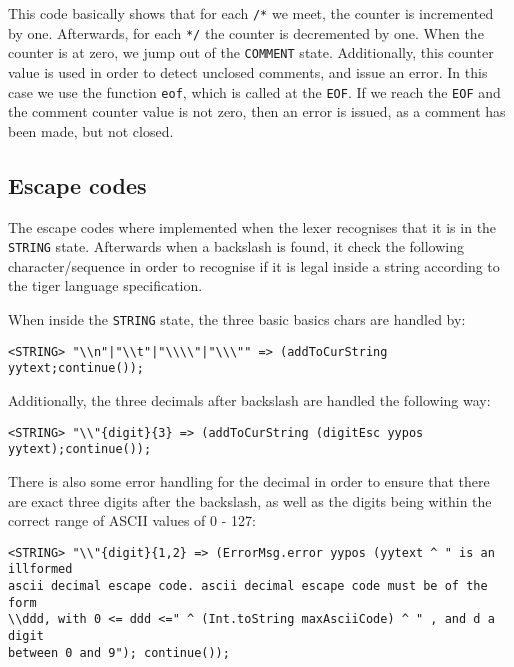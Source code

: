 \documentclass{article}
\begin{document}
This code basically shows that for each \texttt{/*} we meet, the counter is incremented by one. Afterwards, for each \texttt{*/} the counter is decremented by one. When the counter is at zero, we jump out of the \texttt{COMMENT} state. Additionally, this counter value is used in order to detect unclosed comments, and issue an error. In this case we use the function \texttt{eof}, which is called at the \texttt{EOF}. If we reach the \texttt{EOF} and the comment counter value is not zero, then an error is issued, as a comment has been made, but not closed.  

\subsection{Escape codes}
The escape codes where implemented when the lexer recognises that it is in the \texttt{STRING} state. Afterwards when a backslash is found, it check the following character/sequence in order to recognise if it is legal inside a string according to the tiger language specification. 


When inside the \texttt{STRING} state, the three basic basics chars are handled by:

\begin{lstlisting}[frame=single]
<STRING> "\\n"|"\\t"|"\\\\"|"\\\"" => (addToCurString yytext;continue());
\end{lstlisting}

Additionally, the three decimals after backslash are handled the following way:

\begin{lstlisting}[frame=single]
<STRING> "\\"{digit}{3} => (addToCurString (digitEsc yypos yytext);continue());
\end{lstlisting}

There is also some error handling for the decimal in order to ensure that there are exact three digits after the backslash, as well as the digits being within the correct range of ASCII values of 0 - 127:
\begin{lstlisting}[frame=single]
<STRING> "\\"{digit}{1,2} => (ErrorMsg.error yypos (yytext ^ " is an illformed 
ascii decimal escape code. ascii decimal escape code must be of the form 
\\ddd, with 0 <= ddd <=" ^ (Int.toString maxAsciiCode) ^ " , and d a digit 
between 0 and 9"); continue());
\end{lstlisting}
\end{document}
